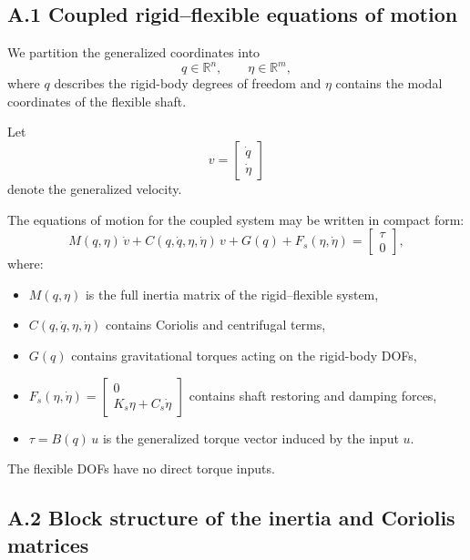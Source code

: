 \documentclass[12pt]{article}
\begin{document}
\subsection{A.1 \quad Coupled rigid--flexible equations of motion}

We partition the generalized coordinates into
\[
  q \in \mathbb{R}^{n}, \qquad \eta \in \mathbb{R}^{m},
\]
where \(q\) describes the rigid-body degrees of freedom and \(\eta\) contains the modal coordinates of the flexible shaft.

Let  
\[
  v = \begin{bmatrix} \dot{q} \\ \dot{\eta} \end{bmatrix}
\]
denote the generalized velocity.

The equations of motion for the coupled system may be written in compact form:
\begin{equation}
  M(q,\eta)\,\dot{v}
  +
  C(q,\dot{q},\eta,\dot{\eta})\,v
  +
  G(q)
  +
  F_{s}(\eta,\dot{\eta})
  =
  \begin{bmatrix}
    \tau \\[0.2em]
    0
  \end{bmatrix},
  \label{eq:appendix_eom}
\end{equation}
where:
\begin{itemize}
  \item \(M(q,\eta)\) is the full inertia matrix of the rigid--flexible system,
  \item \(C(q,\dot{q},\eta,\dot{\eta})\) contains Coriolis and centrifugal terms,
  \item \(G(q)\) contains gravitational torques acting on the rigid-body DOFs,
  \item \(F_{s}(\eta,\dot{\eta}) = \begin{bmatrix} 0 \\ K_s \eta + C_s \dot{\eta} \end{bmatrix}\) contains shaft restoring and damping forces,
  \item \(\tau = B(q)\,u\) is the generalized torque vector induced by the input \(u\).
\end{itemize}

The flexible DOFs have no direct torque inputs.

\subsection{A.2 \quad Block structure of the inertia and Coriolis matrices}
\end{document}
